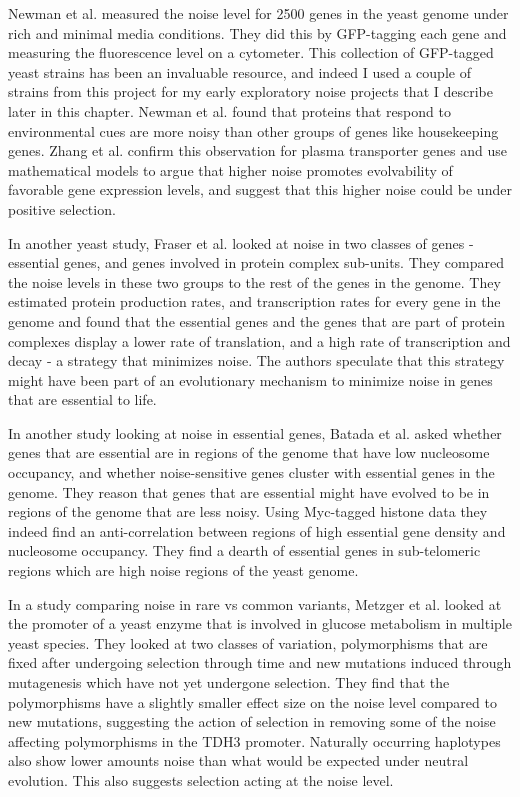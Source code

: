 Newman et al. \cite{newman2006na} measured the noise level for 2500 genes in the yeast genome under rich and minimal media conditions. They did this by GFP-tagging each gene and measuring the fluorescence level on a cytometer. This collection of GFP-tagged yeast strains has been an invaluable resource, and indeed I used a couple of strains from this project for my early exploratory noise projects that I describe later in this chapter. Newman et al. found that proteins that respond to environmental cues are more noisy than other groups of genes like housekeeping genes. Zhang et al. \cite{zhang2009msb} confirm this observation for plasma transporter genes and use mathematical models to argue that higher noise promotes evolvability of favorable gene expression levels, and suggest that this higher noise could be under positive selection. 

In another  yeast study, Fraser et al. \cite{fraser2004pb} looked at noise in two classes of genes - essential genes, and genes involved in protein complex sub-units. They compared the noise levels in these two groups to the rest of the genes in the genome. They estimated protein production rates, and transcription rates for every gene in the genome and found that the essential genes and the genes that are part of protein complexes display a lower rate of translation, and a high rate of transcription and decay - a strategy that minimizes noise. The authors speculate that this strategy might have been part of an evolutionary mechanism to minimize noise in genes that are essential to life.

In another study looking at noise in essential genes, Batada et al. \cite{batada2007ng} asked whether genes that are essential are in regions of the genome that have low nucleosome occupancy, and whether noise-sensitive genes cluster with essential genes in the genome. They reason that genes that are essential might have evolved to be in regions of the genome that are less noisy. Using Myc-tagged histone data they indeed find an anti-correlation between regions of high essential gene density and nucleosome occupancy. They find a dearth of essential genes in sub-telomeric regions which are high noise regions of the yeast genome. 

In a study comparing noise in rare vs common variants, Metzger et al. \cite{metzger2015n} looked at the promoter of a yeast enzyme that is involved in glucose metabolism in multiple yeast species. They looked at two classes of variation, polymorphisms that are fixed after undergoing selection through time and new mutations induced through mutagenesis which have not yet undergone selection. They find that the polymorphisms have a slightly smaller effect size on the noise level compared to new mutations, suggesting the action of selection in removing some of the noise affecting polymorphisms in the TDH3 promoter. Naturally occurring haplotypes also show lower amounts noise than what would be expected under neutral evolution. This also suggests selection acting at the noise level.

